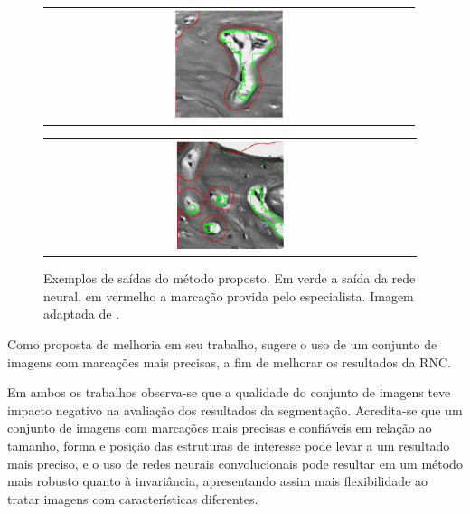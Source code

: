 \begin{figure}[h]
    \center
    \begin{tabular}{@{}c@{}}
        \includegraphics[width=0.3\textwidth]{figures/2_theoric_foundamentations/julia/result1.png}
    \end{tabular}
    \begin{tabular}{@{}c@{}}
        \includegraphics[width=0.3\textwidth]{figures/2_theoric_foundamentations/julia/result2.png}
    \end{tabular}

    
    \caption[Exemplos de saídas do método proposto em \cite{julia2021histological}.]{Exemplos de saídas do método proposto. Em verde a saída da rede neural, em vermelho a marcação provida pelo especialista. Imagem adaptada de \cite{julia2021histological}.}
    \label{fig:julia-results}
\end{figure}

Como proposta de melhoria em seu trabalho, \cite{julia2021histological} sugere o uso de um conjunto de imagens com marcações mais precisas, a fim de melhorar os resultados da \ac{RNC}.

Em ambos os trabalhos observa-se que a qualidade do conjunto de imagens teve impacto negativo na avaliação dos resultados da segmentação. Acredita-se que um conjunto de imagens com marcações mais precisas e confiáveis em relação ao tamanho, forma e posição das estruturas de interesse pode levar a um resultado mais preciso, e o uso de redes neurais convolucionais pode resultar em um método mais robusto quanto à invariância, apresentando assim mais flexibilidade ao tratar imagens com características diferentes. 



